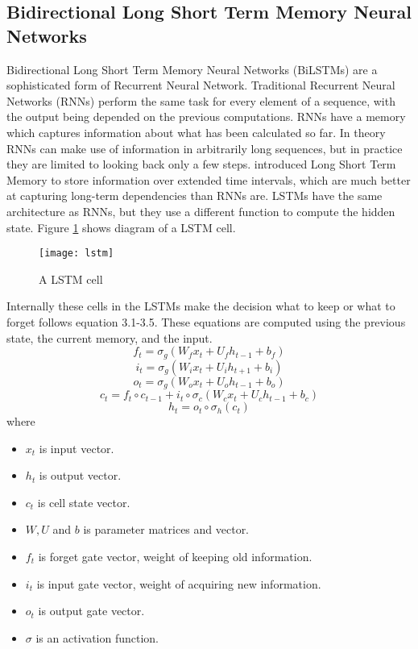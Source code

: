 \subsection{Bidirectional Long Short Term Memory Neural Networks}
\label{bilstm}
Bidirectional Long Short Term Memory Neural Networks (BiLSTMs) are a sophisticated form of Recurrent Neural Network. Traditional Recurrent Neural Networks (RNNs) perform the same task for every element of a sequence, with the output being depended on the previous computations. RNNs have a memory which captures information about what has been calculated so far. In theory RNNs can make use of information in arbitrarily long sequences, but in practice they are limited to looking back only a few steps. \cite{Hochreiter:1997:LSM} introduced Long Short Term Memory to store information over extended time intervals, which are much better at capturing long-term dependencies than RNNs are. LSTMs have the same architecture as RNNs, but they use a different function to compute the hidden state. Figure \ref{fig:lstm} shows diagram of a LSTM cell. \\
\begin{figure}
    \centering
    \texttt{[image: lstm]}
    \caption{A LSTM cell}
    \label{fig:lstm}
\end{figure}
\indent Internally these cells in the LSTMs make the decision what to keep or what to forget follows equation 3.1-3.5. These equations are computed using the previous state, the current memory, and the input. \\
\begin{equation}
    f_t=\sigma_g(W_f x_t + U_f h_{t-1} + b_f)
\end{equation}
\begin{equation}    
    i_t=\sigma_g(W_i x_t + U_i h_{t+1} + b_i)
\end{equation}
\begin{equation}
    o_t=\sigma_g(W_o x_t + U_o h_{t-1} + b_o)    
\end{equation}
\begin{equation}
    c_t=f_t \circ c_{t-1} + i_t \circ \sigma_c(W_c x_t + U_c h_{t-1} + b_c)
\end{equation}
\begin{equation}
    h_t=o_t \circ \sigma_h(c_t)
\end{equation}
where 
\begin{itemize}
\item $x_t$ is input vector.
\item $h_t$ is output vector.
\item $c_t$ is cell state vector.
\item $W , U$ and $b$ is parameter matrices and vector.
\item $f_t$ is forget gate vector, weight of keeping old information.
\item $i_t$ is input gate vector, weight of acquiring new information.
\item $o_t$ is output gate vector.
\item $\sigma$ is an activation function.
\end{itemize}
